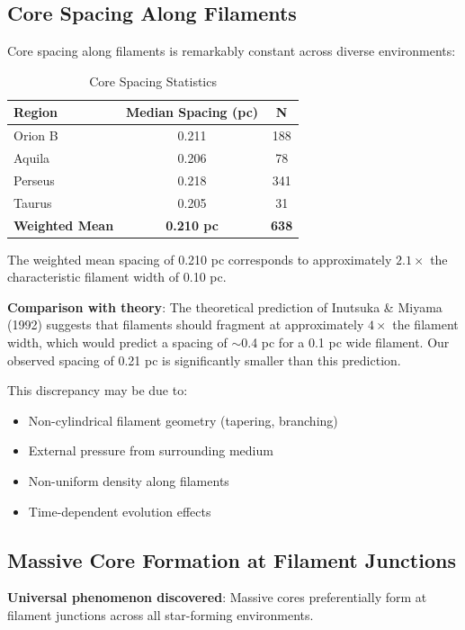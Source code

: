 \documentclass[11pt,a4paper]{article}
\begin{document}
\subsection{Core Spacing Along Filaments}

Core spacing along filaments is remarkably constant across diverse environments:

\begin{table}[H]
\centering
\caption{Core Spacing Statistics}
\begin{tabular}{lcc}
\toprule
Region & Median Spacing (pc) & N \\
\midrule
Orion B  & 0.211 & 188 \\
Aquila  & 0.206 & 78 \\
Perseus & 0.218 & 341 \\
Taurus  & 0.205 & 31 \\
\midrule
\textbf{Weighted Mean} & \textbf{0.210 pc} & \textbf{638} \\
\bottomrule
\end{tabular}
\end{table}

The weighted mean spacing of 0.210 pc corresponds to approximately \textbf{$2.1\times$} the characteristic filament width of 0.10 pc.

\textbf{Comparison with theory}: The theoretical prediction of Inutsuka \& Miyama (1992) suggests that filaments should fragment at approximately $4\times$ the filament width, which would predict a spacing of $\sim$0.4 pc for a 0.1 pc wide filament. Our observed spacing of 0.21 pc is significantly smaller than this prediction.

This discrepancy may be due to:
\begin{itemize}
    \item Non-cylindrical filament geometry (tapering, branching)
    \item External pressure from surrounding medium
    \item Non-uniform density along filaments
    \item Time-dependent evolution effects
\end{itemize}

\subsection{Massive Core Formation at Filament Junctions}

\textbf{Universal phenomenon discovered}: Massive cores preferentially form at filament junctions across all star-forming environments.
\end{document}
